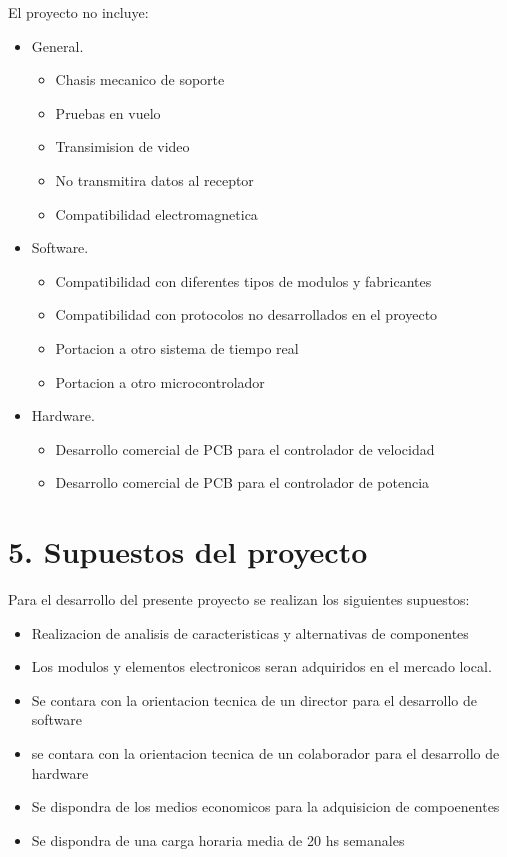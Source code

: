 \documentclass[
11pt, %
]{charter}
\begin{document}
	El proyecto no incluye:
	\begin{itemize}
		\item General.
		    \begin{itemize}
			    \item Chasis mecanico de soporte
			    \item Pruebas en vuelo 
			    \item Transimision de video
			    \item No transmitira datos al receptor
			    \item Compatibilidad electromagnetica 
		    \end{itemize}
		\item Software.
		 	\begin{itemize}
				\item Compatibilidad con diferentes tipos de modulos y fabricantes
			    \item Compatibilidad con protocolos no desarrollados en el proyecto
			    \item Portacion a otro sistema de tiempo real
			    \item Portacion a otro microcontrolador
		    \end{itemize}
		\item Hardware.
		 	\begin{itemize}
				\item Desarrollo comercial de PCB para el controlador de velocidad 
		    	\item Desarrollo comercial de PCB para el controlador de potencia
		    \end{itemize}		
	\end{itemize}




\section{5. Supuestos del proyecto}
\label{sec:supuestos}


	Para el desarrollo del presente proyecto se realizan los siguientes supuestos:

	\begin{itemize}
		\item Realizacion de analisis de caracteristicas y alternativas de componentes
		\item Los modulos y elementos electronicos seran adquiridos en el mercado local.
		\item Se contara con la orientacion tecnica de un director para el desarrollo de software
		\item se contara con la orientacion tecnica de un colaborador para el desarrollo de hardware
		\item Se dispondra de los medios economicos para la adquisicion de compoenentes
		\item Se dispondra de una carga horaria media de 20 hs semanales 
	\end{itemize}
\end{document}
